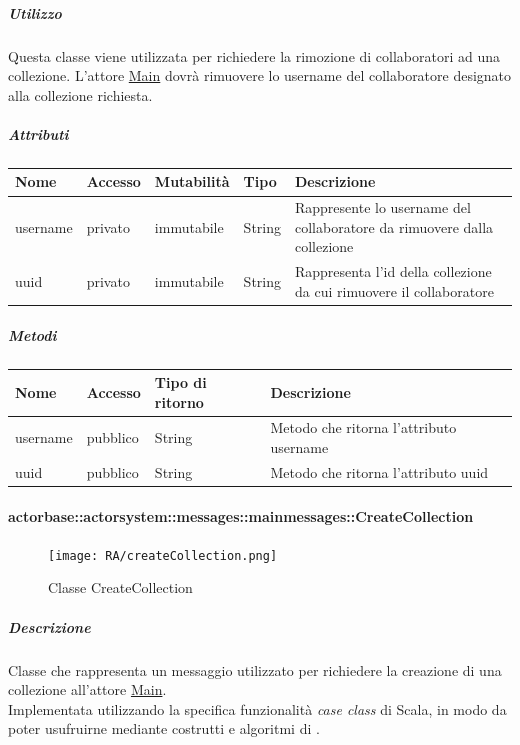 \documentclass{scalatekids-article}
\begin{document}
\subparagraph{Utilizzo}
Questa classe viene utilizzata per richiedere la rimozione di collaboratori ad
una collezione. L'attore
\hyperref[sec:actorbase::actorsystem::actors::main::Main]{Main} dovrà rimuovere
lo username del collaboratore designato alla collezione richiesta.

\subparagraph{Attributi}
\begin{tabular}{| p{2cm} | p{1.5cm} | p{2cm} | p{3cm} | p{8.5cm} |}
  \hline
  Nome & Accesso & Mutabilità & Tipo & Descrizione\\
  \hline
  username & privato & immutabile & String & Rappresente lo username del collaboratore da rimuovere dalla collezione\\
  \hline
  uuid & privato & immutabile & String & Rappresenta l'id della collezione da cui rimuovere il collaboratore\\
  \hline
\end{tabular}

\subparagraph{Metodi}
\begin{tabular}{| p{3cm} | p{1.5cm} | p{3.5cm} | p{9cm} |}
  \hline
  Nome & Accesso & Tipo di ritorno & Descrizione\\
  \hline
  username & pubblico & String & Metodo che ritorna l'attributo username\\
  \hline
  uuid & pubblico & String & Metodo che ritorna l'attributo uuid\\
  \hline
\end{tabular}

\paragraph{actorbase::actorsystem::messages::mainmessages::CreateCollection}
\label{sec:actorbase::actorsystem::messages::mainmessages::CreateCollection}

\begin{figure}[H]
  \begin{center}
    \texttt{[image: RA/createCollection.png]}
    \caption{Classe CreateCollection}
  \end{center}
\end{figure}

\subparagraph{Descrizione}
Classe che rappresenta un messaggio utilizzato per richiedere la creazione di una collezione all'attore \hyperref[sec:actorbase::actorsystem::actors::main::Main]{Main}.\\Implementata
utilizzando la specifica funzionalità \textit{case class} di Scala, in modo da poter usufruirne mediante costrutti e algoritmi di
.
\end{document}
